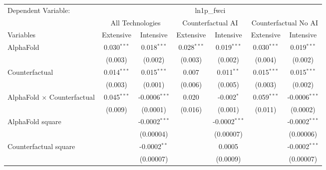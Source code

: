 \begingroup
\centering
\begin{tabular}{lcccccc}
   \tabularnewline \midrule \midrule
   Dependent Variable: & \multicolumn{6}{c}{ln1p\_fwci}\\
 & \multicolumn{2}{c}{All Technologies} & \multicolumn{2}{c}{Counterfactual AI} & \multicolumn{2}{c}{Counterfactual No AI} \\
\cmidrule(lr){1-1}\cmidrule(lr){2-3} \cmidrule(lr){4-5} \cmidrule(lr){6-7}
Variables & \multicolumn{1}{c}{Extensive} & \multicolumn{1}{c}{Intensive} & \multicolumn{1}{c}{Extensive} & \multicolumn{1}{c}{Intensive} & \multicolumn{1}{c}{Extensive} & \multicolumn{1}{c}{Intensive} \\
\cmidrule(lr){1-1}\cmidrule(lr){2-2} \cmidrule(lr){3-3} \cmidrule(lr){4-4} \cmidrule(lr){5-5} \cmidrule(lr){6-6} \cmidrule(lr){7-7}
   AlphaFold                          & 0.030$^{***}$ & 0.018$^{***}$     & 0.028$^{***}$ & 0.019$^{***}$   & 0.030$^{***}$ & 0.019$^{***}$\\   
                                      & (0.003)       & (0.002)           & (0.003)       & (0.002)         & (0.004)       & (0.002)\\   
   Counterfactual                     & 0.014$^{***}$ & 0.015$^{***}$     & 0.007         & 0.011$^{**}$    & 0.015$^{***}$ & 0.015$^{***}$\\   
                                      & (0.003)       & (0.001)           & (0.006)       & (0.005)         & (0.003)       & (0.002)\\   
   AlphaFold $\times$ Counterfactual  & 0.045$^{***}$ & -0.0006$^{***}$   & 0.020         & -0.002$^{*}$    & 0.059$^{***}$ & -0.0006$^{***}$\\   
                                      & (0.009)       & (0.0001)          & (0.016)       & (0.001)         & (0.011)       & (0.0002)\\   
   AlphaFold square                   &               & -0.0002$^{***}$   &               & -0.0002$^{***}$ &               & -0.0002$^{***}$\\   
                                      &               & (0.00004)         &               & (0.00007)       &               & (0.00006)\\   
   Counterfactual square              &               & -0.0002$^{**}$    &               & 0.0005          &               & -0.0002$^{***}$\\   
                                      &               & (0.00007)         &               & (0.0009)        &               & (0.00007)\\   

\end{tabular}
